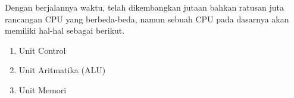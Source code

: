 Dengan berjalannya waktu, telah dikembangkan jutaan bahkan ratusan juta
rancangan CPU yang berbeda-beda, namun sebuah CPU pada dasarnya akan memiliki
hal-hal sebagai berikut.

\begin{enumerate}
  \item Unit Control
  \item Unit Aritmatika (ALU)
  \item Unit Memori
\end{enumerate}
